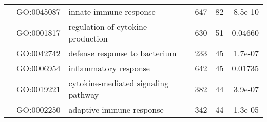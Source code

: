 \begin{landscape}
\begin{longtable}[c]{@{}lllccr@{}}
		                                               & GO:0045087                         & innate immune response                                                    & 647                                                                & 82                                                                   & 8.5e-10                                                                                  \\
		                                               & GO:0001817                         & regulation of cytokine production                                         & 630                                                                & 51                                                                   & 0.04660                                                                                  \\
		                                               & GO:0042742                         & defense response to bacterium                                             & 233                                                                & 45                                                                   & 1.7e-07                                                                                  \\
		                                               & GO:0006954                         & inflammatory response                                                     & 642                                                                & 45                                                                   & 0.01735                                                                                  \\
		                                               & GO:0019221                         & cytokine-mediated signaling pathway                                       & 382                                                                & 44                                                                   & 3.9e-07                                                                                  \\
		                                               & GO:0002250                         & adaptive immune response                                                  & 342                                                                & 44                                                                   & 1.3e-05                                                                                  \\

\end{longtable}
\end{landscape}
